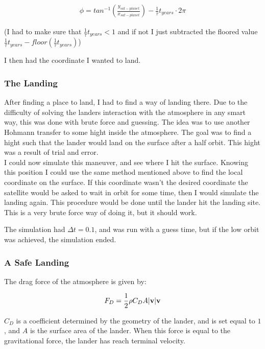 \documentclass[a4paper, 10pt]{article}
\begin{document}
\begin{align}
\phi = tan^{-1}\left(\frac{y_{sat-planet}}{x_{sat-planet}} \right) - \frac{1}{\tau}t_{years}\cdot 2\pi
\end{align}

(I had to make sure that $\frac{1}{\tau}t_{years} < 1$ and if not I just subtracted the floored value $\frac{1}{\tau}t_{years} - floor(\frac{1}{\tau}t_{years})$)

I then had the coordinate I wanted to land.

\subsubsection{The Landing}
After finding a place to land, I had to find a way of landing there. Due to the difficulty of solving the landers interaction with the atmosphere in any smart way, this was done with brute force and guessing. The idea was to use another Hohmann transfer to some hight inside the atmosphere. The goal was to find a hight such that the lander would land on the surface after a half orbit. This hight was a result of trial and error. \\

I could now simulate this maneuver, and see where I hit the surface. Knowing this position I could use the same method mentioned above to find the local coordinate on the surface. If this coordinate wasn't the desired coordinate the satellite would be asked to wait in orbit for some time, then I would simulate the landing again. This procedure would be done until the lander hit the landing site. This is a very brute force way of doing it, but it should work. 


The simulation had $\Delta t = 0.1$, and was run with a guess time, but if the low orbit was achieved, the simulation ended.

\subsubsection{A Safe Landing}

The drag force of the atmosphere is given by:

\begin{align}
F_D = \frac{1}{2}\rho C_D A |\bold{v}| \bold{v}
\end{align}

$C_D$ is a coefficient determined by the geometry of the lander, and is set equal to $1$, and $A$ is the surface area of the lander. When this force is equal to the gravitational force, the lander has reach terminal velocity.
\end{document}
